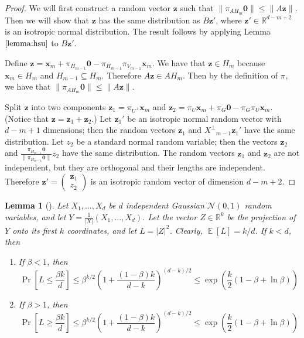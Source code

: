 \documentclass{article}
\newtheorem{lemma}{Lemma}
\theoremstyle{definition}
\DeclareMathOperator*{\Eop}{\mathbb{E}}
\newcommand{\E}[1]{\ensuremath{\Eop\left[{#1}\right]}}
\DeclareMathOperator*{\probop}{Pr}
\newcommand{\prob}[1]{\ensuremath{\probop\left[{#1}\right]}}
\newcommand{\proj}[1]{\ensuremath{\pi}_{#1}}
\newcommand{\ltwo}[1]{\lVert{#1}\rVert}
\newcommand{\normal}[2]{\ensuremath{\mathcal{N}\left({{#1}},{{#2}}\right)}}
\newcommand{\comp}[1]{\ensuremath{{#1}^\bot}}
\newcommand{\zero}{\mathbf{0}}
\newcommand{\x}{\mathbf{x}}
\newcommand{\z}{\mathbf{z}}
\begin{document}
\noindent

\begin{proof}
We will first construct a random vector $\z$ such that $\ltwo{\proj{AH_m}\zero} \le \ltwo {A\z} $.
Then we will show that $\z$ has the same distribution as $B\z'$,
where $\z'\in\mathbb{R}^{d-m+2}$ is an isotropic normal distribution.
The result follows by applying Lemma $\ref{lemma:hsu}$ to $B\z'$.

Define
$
\z
=
\x_m +\proj{H_{m-1}}\zero-\proj{H_{m-1}}\proj{V_{m-1}}\x_m
$.
We have that $\z\in H_m$ because $\x_m\in H_m$ and $H_{m-1}\subseteq H_m$.
Therefore $A\z \in AH_m$.
Then by the definition of $\proj{}$,
we have that $\ltwo {\proj{AH_m}\zero}\le\ltwo{A\z}$.

Split $\z$ into two components $\z_1=\proj{\comp U}\x_m$ and $\z_2=\proj{U}\x_m+\proj{G}\zero-\proj{G}\proj{U}\x_m$.
(Notice that $\z=\z_1+\z_2$.)
Let $\z_1'$ be an isotropic normal random vector with $d-m+1$ dimensions;
then the random vectors $\z_1$ and $\comp X_{m-1}\z_1'$ have the same distribution.
Let $z_2$ be a standard normal random variable;
then the vectors $\z_2$ and $\frac{\proj {H_{m-1}} \zero}{\ltwo{\proj {H_{m-1}} \zero}}z_2$ have the same distribution.
The random vectors $\z_1$ and $\z_2$ are not independent,
but they are orthogonal and their lengths are independent.
Therefore
$\z' =
\begin{pmatrix}
\z_1\\
z_2
\end{pmatrix}
$
is an isotropic random vector of dimension $d-m+2$.
\end{proof}

\newpage

\begin{lemma}[\cite{dasgupta2003elementary}]
\label{lemma:dasgupta}
Let $X_1,...,X_d$ be $d$ independent Gaussian \normal{0}{1} random variables,
and let $Y=\frac{1}{|X|}(X_1,...,X_d)$.
Let the vector $Z\in\mathbb{R}^k$ be the projection of $Y$ onto its first $k$ coordinates,
and let $L=|Z|^2$.
Clearly, $\E{L}=k/d$.
If $k<d$, then
\begin{enumerate}
\item If $\beta < 1$, then
\begin{equation}
\prob{L \le \frac{\beta k}{d}}
\le
\beta^{k/2}\left(1+\frac{(1-\beta)k}{d-k}\right)^{(d-k)/2}
\le
\exp \left( \frac{k}{2} (1-\beta+\ln \beta) \right)
\end{equation}
\item If $\beta > 1$, then
\begin{equation}
\prob{L \ge \frac{\beta k}{d}}
\le
\beta^{k/2}\left(1+\frac{(1-\beta)k}{d-k}\right)^{(d-k)/2}
\le
\exp \left( \frac{k}{2} (1-\beta+\ln \beta) \right)
\end{equation}
\end{enumerate}
\end{lemma}
\end{document}
